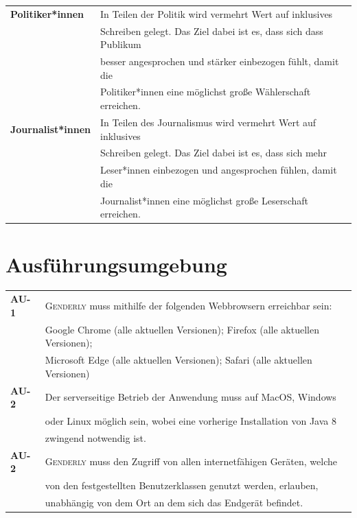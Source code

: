 \documentclass[paper=a4, parskip=half]{scrreprt}
\newcommand{\Genderly}{\textsc{Genderly}}
\begin{document}
\begin{table}[!htb]
\begin{tabular}{ll}
\textbf{Politiker*innen} & In Teilen der Politik wird vermehrt Wert auf inklusives \\
& Schreiben gelegt. Das Ziel dabei ist es, dass sich dass Publikum \\
& besser angesprochen und stärker einbezogen fühlt, damit die \\
& Politiker*innen eine möglichst große Wählerschaft erreichen. \vspace{0.15cm} \\

\textbf{Journalist*innen} & In Teilen des Journalismus wird vermehrt Wert auf inklusives \\
& Schreiben gelegt. Das Ziel dabei ist es, dass sich mehr \\
& Leser*innen einbezogen und angesprochen fühlen, damit die \\
& Journalist*innen eine möglichst große Leserschaft erreichen. \vspace{0.15cm} \\
\end{tabular}
\end{table}

\pagebreak

\section{Ausführungsumgebung}
\begin{table}[!htb]
\begin{tabular}{ll}
\textbf{AU-1} & \Genderly{} muss mithilfe der folgenden Webbrowsern erreichbar sein: \\
& Google Chrome (alle aktuellen Versionen); Firefox (alle aktuellen Versionen);\\
& Microsoft Edge (alle aktuellen Versionen); Safari (alle aktuellen Versionen) \vspace{0.15cm} \\
\textbf{AU-2} & Der serverseitige Betrieb der Anwendung muss auf MacOS, Windows \\
& oder Linux möglich sein, wobei eine vorherige Installation von Java 8 \\
& zwingend notwendig ist. \vspace{0.15cm}\\
\textbf{AU-2} & \Genderly{} muss den Zugriff von allen internetfähigen Geräten, welche \\
& von den festgestellten Benutzerklassen genutzt werden, erlauben, \\
& unabhängig von dem Ort an dem sich das Endgerät befindet. \vspace{0.15cm}\\
\end{tabular}
\end{table}
\end{document}
